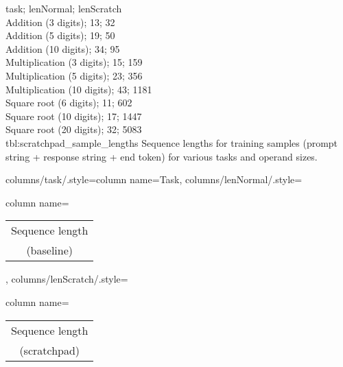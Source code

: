 {
	task; lenNormal; lenScratch\\
	Addition (3 digits); 13; 32 \\
	Addition (5 digits); 19; 50 \\
	Addition (10 digits); 34; 95 \\
	Multiplication (3 digits); 15; 159 \\
	Multiplication (5 digits); 23; 356 \\
	Multiplication (10 digits); 43; 1181 \\
	Square root (6 digits); 11; 602 \\
	Square root (10 digits); 17; 1447 \\
	Square root (20 digits); 32; 5083 \\
}
{tbl:scratchpad_sample_lengths}
{
	Sequence lengths for training samples (prompt string + response string + end token) for various tasks and operand sizes.
}
{%
	columns/task/.style={column name={Task}},
	columns/lenNormal/.style={column name={\begin{tabular}{c} Sequence length \\ (baseline) \\ \end{tabular}}},
	columns/lenScratch/.style={column name={\begin{tabular}{c} Sequence length \\ (scratchpad) \\ \end{tabular}}}
}



